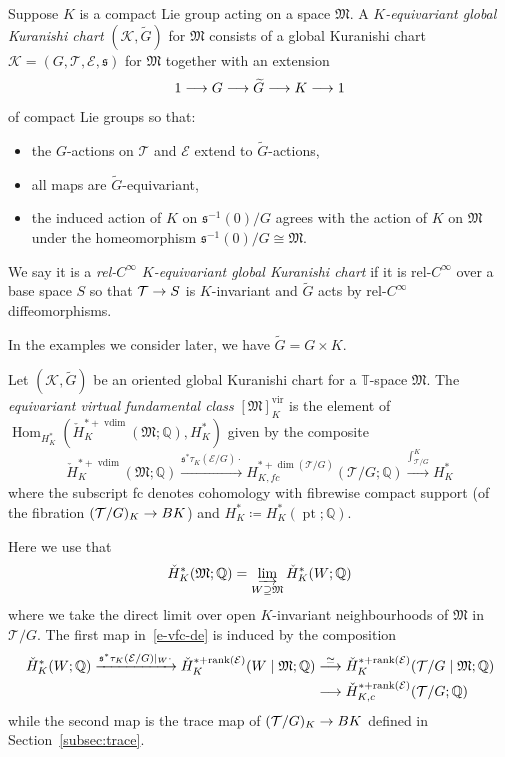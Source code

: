 \documentclass[AHL,Unicode,longabstracts]{cedram}
\newcommand{\super}{\supseteq}
\newcommand{\inv}{^{-1}}
\newcommand{\vfc}[1]{[#1]^{\virt}}
\newcommand{\chml}{\check{H}}
\newcommand{\fcolim}{\varinjlim\limits}
\newcommand{\wt}{\widetilde}
\newcommand{\bQ}{\mathbb{Q}}
\newcommand{\bT}{\mathbb{T}}
\newcommand{\cE}{\mathcal{E}}
\newcommand{\cK}{\mathcal{K}}
\newcommand{\cT}{\mathcal{T}}
\newcommand{\fM}{\mathfrak{M}}
\newcommand{\fs}{\mathfrak{s}}
\DeclareMathOperator{\virt}{vir}
\DeclareMathOperator{\rank}{rank}
\DeclareMathOperator{\Pt}{pt}
\DeclareMathOperator{\Hom}{Hom}
\DeclareMathOperator{\vdim}{vdim}
\newcommand{\xra}{\xrightarrow}
\renewcommand*{\to}{\mathchoice{\longrightarrow}{\rightarrow}{\rightarrow}{\rightarrow}}
\begin{document}
\begin{defi}
Suppose $K$ is a compact Lie group acting on a space $\fM$. A \emph{$K$-equivariant global Kuranishi chart} $(\cK,\wt G)$ for $\fM$ consists of a global Kuranishi chart $\cK = (G,\cT,\cE,\fs)$ for $\fM$ together with an extension
\[
1 \to G\to \wt G\to K \to 1
\]
of compact Lie groups so that:
\begin{itemize}
\item the $G$-actions on $\cT$ and $\cE$ extend to $\wt G$-actions,
\item all maps are $\wt G$-equivariant,
\item the induced action of $K$ on $\fs\inv(0)/G$ agrees with the action of $K$ on $\fM$ under the homeomorphism $\fs\inv(0)/G\cong \fM$.
\end{itemize}
We say it is a \emph{rel-$C^\infty$ $K$-equivariant global Kuranishi chart} if it is rel-$C^\infty$ over a base space $S$ so that $\cT\to S$ is $K$-invariant and $\wt G$ acts by rel-$C^\infty$ diffeomorphisms.
\end{defi}

In the examples we consider later, we have $\wt G = G\times K$.


\begin{defi}\label{equivariant-vf-de}
Let $(\cK,\wt G)$ be an oriented global Kuranishi chart for a $\bT$-space $\fM$. The \emph{equivariant virtual fundamental class} $\vfc{\fM}_K$ is the element of $\Hom_{H_K^*}(\chml^{*+\vdim}_K(\fM;\bQ),H^*_K)$ given by the composite
\begin{equation}\label{e-vfc-de}
\chml^{*+\vdim}_K(\fM;\bQ) \xra{\fs^*\tau_K(\cE/G) \cdot}H^{*+\dim(\cT/G)}_{K,fc}(\cT/G;\bQ)\xra{\int^K_{\cT/G}} H^*_K
\end{equation}
where the subscript fc denotes cohomology with fibrewise compact support (of the fibration $(\cT/G)_K \to BK$) and $H^*_K\coloneqq H^*_K(\Pt;\bQ)$.
\end{defi}

Here we use that
\[
\chml^*_K(\fM;\bQ) = \fcolim_{W\super \fM}\chml^*_K(W;\bQ)
\]
where we take the direct limit over open $K$-invariant neighbourhoods of $\fM$ in $\cT/G$. The first map in~\eqref{e-vfc-de} is induced by the composition
\begin{align*}
\chml^*_K(W;\bQ)\xra{\fs^*\tau_K(\cE/G)|_W\cdot} \chml^{*+\rank(\cE)}_K(W\mid \fM;\bQ) &\overset{\simeq}{\to}\chml^{*+\rank(\cE)}_K(\cT/G\mid\fM;\bQ)\\
&\to \chml^{*+\rank(\cE)}_{K,c}(\cT/G;\bQ)
\end{align*}
while the second map is the trace map of $(\cT/G)_K \to BK$ defined in Section~\ref{subsec:trace}.
\end{document}
